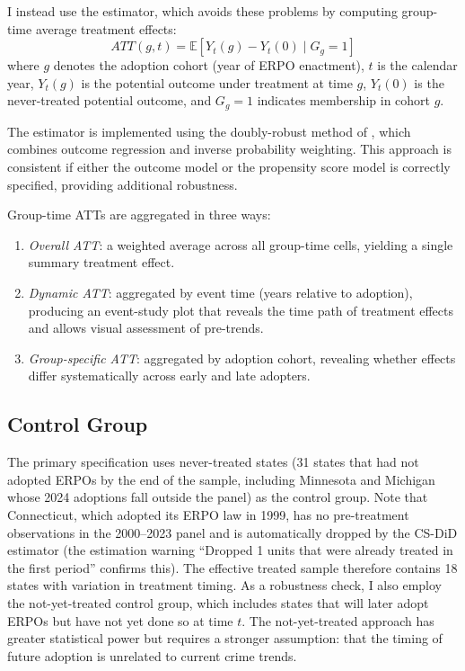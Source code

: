 \documentclass[12pt]{article}
\newcommand{\E}{\mathbb{E}}
\begin{document}
I instead use the \citet{callaway2021difference} estimator, which avoids these problems by computing group-time average treatment effects:
\begin{equation}
ATT(g,t) = \E[Y_t(g) - Y_t(0) \mid G_g = 1]
\end{equation}
where $g$ denotes the adoption cohort (year of ERPO enactment), $t$ is the calendar year, $Y_t(g)$ is the potential outcome under treatment at time $g$, $Y_t(0)$ is the never-treated potential outcome, and $G_g = 1$ indicates membership in cohort $g$.

The estimator is implemented using the doubly-robust method of \citet{santanna2020doubly}, which combines outcome regression and inverse probability weighting. This approach is consistent if either the outcome model or the propensity score model is correctly specified, providing additional robustness.

Group-time ATTs are aggregated in three ways:
\begin{enumerate}
\item \textit{Overall ATT}: a weighted average across all group-time cells, yielding a single summary treatment effect.
\item \textit{Dynamic ATT}: aggregated by event time (years relative to adoption), producing an event-study plot that reveals the time path of treatment effects and allows visual assessment of pre-trends.
\item \textit{Group-specific ATT}: aggregated by adoption cohort, revealing whether effects differ systematically across early and late adopters.
\end{enumerate}

\subsection{Control Group}

The primary specification uses never-treated states (31 states that had not adopted ERPOs by the end of the sample, including Minnesota and Michigan whose 2024 adoptions fall outside the panel) as the control group. Note that Connecticut, which adopted its ERPO law in 1999, has no pre-treatment observations in the 2000--2023 panel and is automatically dropped by the CS-DiD estimator (the estimation warning ``Dropped 1 units that were already treated in the first period'' confirms this). The effective treated sample therefore contains 18 states with variation in treatment timing. As a robustness check, I also employ the not-yet-treated control group, which includes states that will later adopt ERPOs but have not yet done so at time $t$. The not-yet-treated approach has greater statistical power but requires a stronger assumption: that the timing of future adoption is unrelated to current crime trends.
\end{document}

